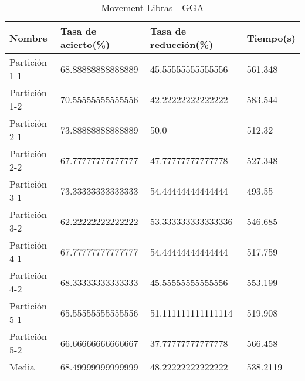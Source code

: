 \begin{table}[H]
	\centering
	\begin{tabular}{l|lll}
		Nombre        & Tasa de acierto(\%) & Tasa de reducción(\%) & Tiempo(s) \\ \hline
		Partición 1-1 & 68.88888888888889   & 45.55555555555556     & 561.348   \\
		Partición 1-2 & 70.55555555555556   & 42.22222222222222     & 583.544   \\
		Partición 2-1 & 73.88888888888889   & 50.0                  & 512.32    \\
		Partición 2-2 & 67.77777777777777   & 47.77777777777778     & 527.348   \\
		Partición 3-1 & 73.33333333333333   & 54.44444444444444     & 493.55    \\
		Partición 3-2 & 62.22222222222222   & 53.333333333333336    & 546.685   \\
		Partición 4-1 & 67.77777777777777   & 54.44444444444444     & 517.759   \\
		Partición 4-2 & 68.33333333333333   & 45.55555555555556     & 553.199   \\
		Partición 5-1 & 65.55555555555556   & 51.111111111111114    & 519.908   \\
		Partición 5-2 & 66.66666666666667   & 37.77777777777778     & 566.458   \\ \hline
		Media         & 68.49999999999999   & 48.22222222222222     & 538.2119
	\end{tabular}
	\caption{Movement Libras - GGA}
	\label{MLIB-GGA}
\end{table}